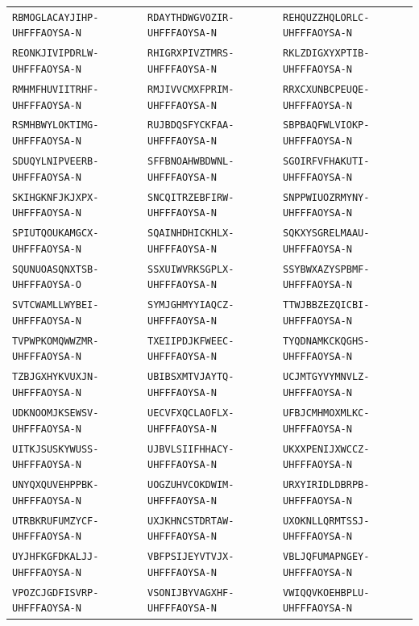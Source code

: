 {\begin{longtable}{@{}lll@{}}
\texttt{RBMOGLACAYJIHP-UHFFFAOYSA-N} & \texttt{RDAYTHDWGVOZIR-UHFFFAOYSA-N} & \texttt{REHQUZZHQLORLC-UHFFFAOYSA-N} \\
\texttt{REONKJIVIPDRLW-UHFFFAOYSA-N} & \texttt{RHIGRXPIVZTMRS-UHFFFAOYSA-N} & \texttt{RKLZDIGXYXPTIB-UHFFFAOYSA-N} \\
\texttt{RMHMFHUVIITRHF-UHFFFAOYSA-N} & \texttt{RMJIVVCMXFPRIM-UHFFFAOYSA-N} & \texttt{RRXCXUNBCPEUQE-UHFFFAOYSA-N} \\
\texttt{RSMHBWYLOKTIMG-UHFFFAOYSA-N} & \texttt{RUJBDQSFYCKFAA-UHFFFAOYSA-N} & \texttt{SBPBAQFWLVIOKP-UHFFFAOYSA-N} \\
\texttt{SDUQYLNIPVEERB-UHFFFAOYSA-N} & \texttt{SFFBNOAHWBDWNL-UHFFFAOYSA-N} & \texttt{SGOIRFVFHAKUTI-UHFFFAOYSA-N} \\
\texttt{SKIHGKNFJKJXPX-UHFFFAOYSA-N} & \texttt{SNCQITRZEBFIRW-UHFFFAOYSA-N} & \texttt{SNPPWIUOZRMYNY-UHFFFAOYSA-N} \\
\texttt{SPIUTQOUKAMGCX-UHFFFAOYSA-N} & \texttt{SQAINHDHICKHLX-UHFFFAOYSA-N} & \texttt{SQKXYSGRELMAAU-UHFFFAOYSA-N} \\
\texttt{SQUNUOASQNXTSB-UHFFFAOYSA-O} & \texttt{SSXUIWVRKSGPLX-UHFFFAOYSA-N} & \texttt{SSYBWXAZYSPBMF-UHFFFAOYSA-N} \\
\texttt{SVTCWAMLLWYBEI-UHFFFAOYSA-N} & \texttt{SYMJGHMYYIAQCZ-UHFFFAOYSA-N} & \texttt{TTWJBBZEZQICBI-UHFFFAOYSA-N} \\
\texttt{TVPWPKOMQWWZMR-UHFFFAOYSA-N} & \texttt{TXEIIPDJKFWEEC-UHFFFAOYSA-N} & \texttt{TYQDNAMKCKQGHS-UHFFFAOYSA-N} \\
\texttt{TZBJGXHYKVUXJN-UHFFFAOYSA-N} & \texttt{UBIBSXMTVJAYTQ-UHFFFAOYSA-N} & \texttt{UCJMTGYVYMNVLZ-UHFFFAOYSA-N} \\
\texttt{UDKNOOMJKSEWSV-UHFFFAOYSA-N} & \texttt{UECVFXQCLAOFLX-UHFFFAOYSA-N} & \texttt{UFBJCMHMOXMLKC-UHFFFAOYSA-N} \\
\texttt{UITKJSUSKYWUSS-UHFFFAOYSA-N} & \texttt{UJBVLSIIFHHACY-UHFFFAOYSA-N} & \texttt{UKXXPENIJXWCCZ-UHFFFAOYSA-N} \\
\texttt{UNYQXQUVEHPPBK-UHFFFAOYSA-N} & \texttt{UOGZUHVCOKDWIM-UHFFFAOYSA-N} & \texttt{URXYIRIDLDBRPB-UHFFFAOYSA-N} \\
\texttt{UTRBKRUFUMZYCF-UHFFFAOYSA-N} & \texttt{UXJKHNCSTDRTAW-UHFFFAOYSA-N} & \texttt{UXOKNLLQRMTSSJ-UHFFFAOYSA-N} \\
\texttt{UYJHFKGFDKALJJ-UHFFFAOYSA-N} & \texttt{VBFPSIJEYVTVJX-UHFFFAOYSA-N} & \texttt{VBLJQFUMAPNGEY-UHFFFAOYSA-N} \\
\texttt{VPOZCJGDFISVRP-UHFFFAOYSA-N} & \texttt{VSONIJBYVAGXHF-UHFFFAOYSA-N} & \texttt{VWIQQVKOEHBPLU-UHFFFAOYSA-N} \\

\end{longtable}}

